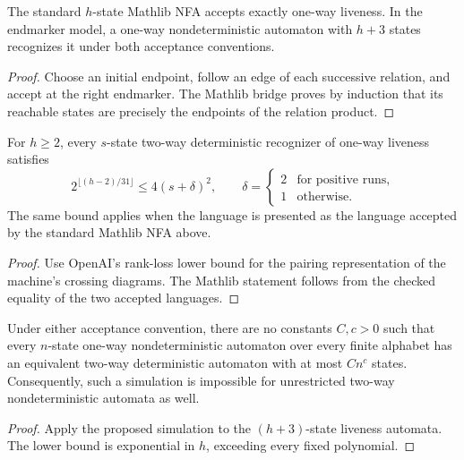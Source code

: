 \begin{theorem}
  \label{thm:models-one-way-liveness-upper}
  \leanok
  The standard $h$-state Mathlib NFA accepts exactly one-way liveness.
  In the endmarker model, a one-way nondeterministic automaton with $h+3$
  states recognizes it under both acceptance conventions.
\end{theorem}
\begin{proof}
  \leanok
  Choose an initial endpoint, follow an edge of each successive relation,
  and accept at the right endmarker. The Mathlib bridge proves by induction
  that its reachable states are precisely the endpoints of the relation product.
\end{proof}

\begin{theorem}
  \label{thm:models-one-way-liveness-lower}
  \leanok
  For $h\ge2$, every $s$-state two-way deterministic recognizer of one-way
  liveness satisfies
  \[
    2^{\lfloor(h-2)/31\rfloor}\le4(s+\delta)^2,
    \qquad
    \delta=\begin{cases}2&\text{for positive runs},\\1&\text{otherwise}.
    \end{cases}
  \]
  The same bound applies when the language is presented as the language
  accepted by the standard Mathlib NFA above.
\end{theorem}
\begin{proof}
  \leanok
  Use OpenAI's rank-loss lower bound for the pairing representation of the
  machine's crossing diagrams. The Mathlib statement follows from the
  checked equality of the two accepted languages.
\end{proof}

\begin{corollary}
  \label{cor:models-no-polynomial-automata-simulation}
  \leanok
  Under either acceptance convention, there are no constants $C,c>0$
  such that every $n$-state one-way nondeterministic automaton over every
  finite alphabet has an equivalent two-way deterministic automaton with
  at most $Cn^c$ states. Consequently, such a simulation is impossible for
  unrestricted two-way nondeterministic automata as well.
\end{corollary}
\begin{proof}
  \leanok
  Apply the proposed simulation to the $(h+3)$-state liveness automata.
  The lower bound is exponential in $h$, exceeding every fixed polynomial.
\end{proof}

